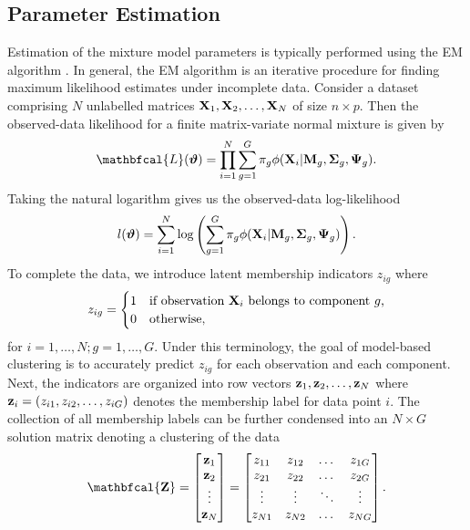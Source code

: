 \documentclass[12pt]{report}
\begin{document}
\subsection{Parameter Estimation}
Estimation of the mixture model parameters is typically performed using the EM algorithm \citep{dempster1977}. In general, the EM algorithm is an iterative procedure for finding maximum likelihood estimates under incomplete data. Consider a dataset comprising $N$ unlabelled matrices ${\bf X}_1, {\bf X}_2, \dots, {\bf X}_N$ of size $n \times p$. Then the observed-data likelihood for a finite matrix-variate normal mixture is given by
\begin{equation*}
\mathbfcal{L}(\bm{\vartheta}) = \prod_{i=1}^N \sum_{g=1}^G\pi_g \phi({\bf X}_i | {\bf M}_g, {\bf \Sigma}_g, {\bf \Psi}_g).
\end{equation*} 
Taking the natural logarithm gives us the observed-data log-likelihood
\begin{equation*}
l(\bm{\vartheta}) = \sum_{i=1}^N \log \left (\sum_{g=1}^G\pi_g \phi({\bf X}_i | {\bf M}_g, {\bf \Sigma}_g, {\bf \Psi}_g)\right).
\end{equation*} 
To complete the data, we introduce latent membership indicators $z_{ig}$ where 
\begin{equation*}
z_{ig} = 
\begin{cases}
    1 & \text{if observation ${\bf X}_i$ belongs to component $g$,} \\
    0 & \text{otherwise},
    \end{cases}
\end{equation*} 
for $i= 1, \dots, N; g = 1, \dots, G$. Under this terminology, the goal of model-based clustering is to accurately predict $z_{ig}$ for each observation and each component. Next, the indicators are organized into row vectors ${\bf z}_1, {\bf z}_2, \dots, {\bf z}_N$ where ${\bf z}_i = (z_{i1}, z_{i2}, \dots, z_{iG})$ denotes the membership label for data point $i$. The collection of all membership labels can be further condensed into an $N \times G$ solution matrix denoting a clustering of the data 
\begin{equation*}
{\bf \mathbfcal{Z}} = 
\begin{bmatrix}
{\bf z}_1 \\
{\bf z}_2 \\
\vdots \\
{\bf z}_N \\
 \end{bmatrix} 
 = 
 \begin{bmatrix}
    z_{11} & z_{12} & \dots & z_{1G} \\
    z_{21} & z_{22}& \dots & z_{2G}\\
    \vdots & \vdots & \ddots & \vdots \\
    z_{N1}& z_{N2}& \dots & z_{NG}\\
\end{bmatrix}.
\end{equation*}
\end{document}
